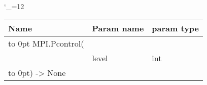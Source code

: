 \begingroup \catcode`\_=12 \tt
\begin{tabular}{lll}
\toprule
\textrm{Name}&\textrm{Param name}&\textrm{param type}\\
\midrule
\hbox to 0pt {MPI.Pcontrol(\hss}\\
& level & int\\
\hbox to 0pt{) -> None\hss}\\
\bottomrule
\end{tabular}
\endgroup
